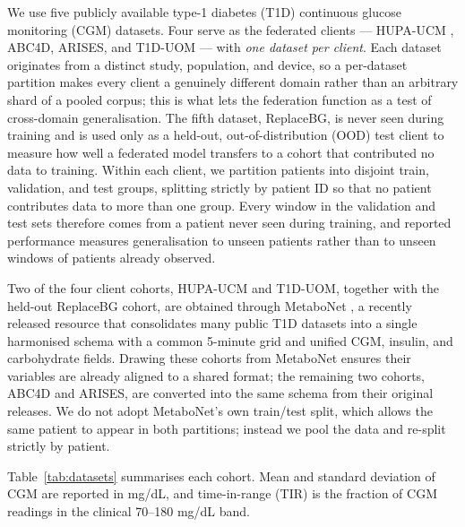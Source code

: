 \documentclass[10pt,letterpaper]{article}
\begin{document}
We use five publicly available type-1 diabetes (T1D) continuous glucose
monitoring (CGM) datasets. Four serve as the federated clients --- HUPA-UCM
\cite{hidalgo2024hupaucm}, ABC4D, ARISES, and T1D-UOM
\cite{alsuhaymi2025t1duom} --- with \emph{one dataset per client}. Each dataset
originates from a distinct study, population, and device, so a per-dataset
partition makes every client a genuinely different domain rather than an
arbitrary shard of a pooled corpus; this is what lets the federation function as
a test of cross-domain generalisation. The fifth dataset, ReplaceBG, is never
seen during training and is used only as a held-out, out-of-distribution (OOD)
test client to measure how well a federated model transfers to a cohort that
contributed no data to training. Within each client, we partition patients
into disjoint train, validation, and test groups, splitting strictly by
patient ID so that no patient contributes data to more than one group. Every
window in the validation and test sets therefore comes from a patient never
seen during training, and reported performance measures generalisation to
unseen patients rather than to unseen windows of patients already observed.

Two of the four client cohorts, HUPA-UCM and T1D-UOM, together with the held-out
ReplaceBG cohort, are obtained through MetaboNet
\cite{wolff2026metabonet}, a recently released resource that consolidates many
public T1D datasets into a single harmonised schema with a common 5-minute grid
and unified CGM, insulin, and carbohydrate fields. Drawing these cohorts from
MetaboNet ensures their variables are already aligned to a shared format; the
remaining two cohorts, ABC4D and ARISES, are converted into the same schema
from their original releases. We do not adopt MetaboNet's own train/test split,
which allows the same patient to appear in both partitions; instead we pool the
data and re-split strictly by patient.

Table~\ref{tab:datasets} summarises each cohort. Mean and standard deviation of
CGM are reported in mg/dL, and time-in-range (TIR) is the fraction of CGM
readings in the clinical 70--180 mg/dL band.
\end{document}
